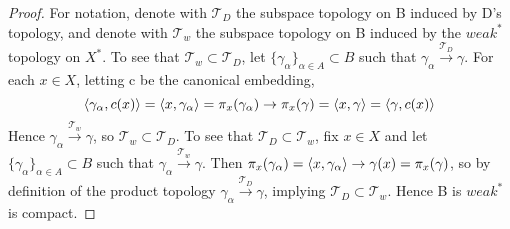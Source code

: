 \begin{thm}
\begin{proof}
        For notation, denote with $\mathcal{T}_D$ the subspace topology on B induced by D's topology, and denote with $\mathcal{T}_w$ the subspace topology on B induced by the  $weak^*$ topology on $X^*$. 
        To see that $\mathcal{T}_w \subset \mathcal{T}_D$, let $\{\gamma_\alpha\}_{\alpha \in A} \subset B$ such that $\gamma_\alpha \overset{\mathcal{T}_D}{\to} \gamma$. For each $x \in X$, letting c be the canonical embedding, 
        \begin{equation}
            \left\langle \gamma_{\alpha}, c(x) \right\rangle= \left\langle x,\gamma_\alpha \right\rangle = \pi_x(\gamma_\alpha) \to \pi_x(\gamma) = \left\langle x,\gamma \right\rangle = \left\langle \gamma, c(x) \right\rangle
        \end{equation}
        Hence $\gamma_\alpha \overset{\mathcal{T}_w}{\to} \gamma$, so $\mathcal{T}_w \subset \mathcal{T}_D$.  
        To see that $\mathcal{T}_D \subset \mathcal{T}_w$, fix $x\in X$ and let $\{\gamma_\alpha\}_{\alpha \in A} \subset B$ such that $\gamma_\alpha \overset{\mathcal{T}_w}{\to} \gamma$. 
        Then $\pi_x(\gamma_\alpha) = \left\langle x,\gamma_\alpha \right\rangle \to \gamma(x) = \pi_x(\gamma)$, so by definition of the product topology $\gamma_\alpha \overset{\mathcal{T}_D}{\to} \gamma$, implying $\mathcal{T}_D \subset \mathcal{T}_w$.  Hence B is $weak^{*}$ is compact. 
    \end{proof}
\end{thm} 

